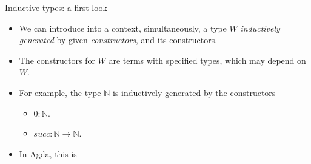 \documentclass[10 pt., handout]{beamer}
\theoremstyle{plain}
\theoremstyle{remark}
\newcommand{\N}{\mathbb{N}}
\begin{document}
\begin{frame}{Inductive types: a first look}

\begin{itemize}

\item We can introduce into a context, simultaneously, a type $W$ \emph{inductively generated} by given \emph{constructors}, and its constructors.

\item The constructors for $W$ are terms with specified types, which may depend on $W$.

\item For example, the type $\N$ is inductively generated by the constructors
\begin{itemize}
\item $0: \N$.
\item $succ : \N \to \N$.
\end{itemize}

\item In Agda, this is

\begin{code}\>\<%
\\
\>  \AgdaSymbol{:}  \<%
\\
\>[0]\<[2]%
\>[2] \AgdaSymbol{:} \<%
\\
\>[0]\<[2]%
\>[2] \AgdaSymbol{:}   \<%
\\
\>\<\end{code}

\end{itemize}

\end{frame}
\end{document}

